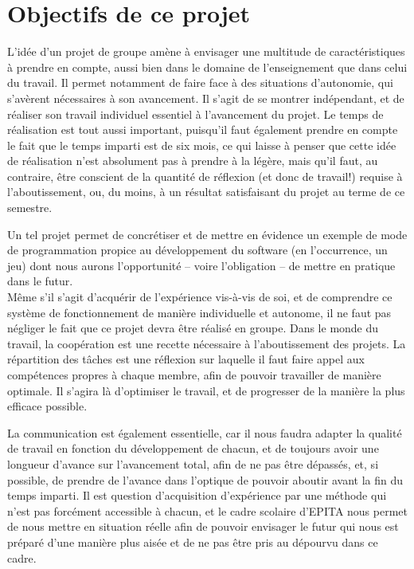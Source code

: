 \documentclass[10pt, titlepage]{report}
\begin{document}
\chapter{Objectifs de ce projet}

L'idée d'un projet de groupe amène à envisager une multitude de caractéristiques à prendre en compte, aussi bien dans le domaine de l'enseignement que dans celui du travail. Il permet notamment de faire face à des situations d'autonomie, qui s'avèrent nécessaires à son avancement. Il s'agit de se montrer indépendant, et de réaliser son travail individuel essentiel à l'avancement du projet. Le temps de réalisation est tout aussi important, puisqu'il faut également prendre en compte le fait que le temps imparti est de six mois, ce qui laisse à penser que cette idée de réalisation n'est absolument pas à prendre à la légère, mais qu'il faut, au contraire, être conscient de la quantité de réflexion (et donc de travail!) requise à l'aboutissement, ou, du moins, à un résultat satisfaisant du projet au terme de ce semestre.

Un tel projet permet de concrétiser et de mettre en évidence un exemple de mode de programmation propice au développement du software (en l’occurrence, un jeu) dont nous aurons l'opportunité – voire l'obligation – de mettre en pratique dans le futur.\\

Même s'il s'agit d'acquérir de l'expérience vis-à-vis de soi, et de comprendre ce système de fonctionnement de manière individuelle et autonome, il ne faut pas négliger le fait que ce projet devra être réalisé en groupe. Dans le monde du travail, la coopération est une recette nécessaire à l'aboutissement des projets. La répartition des tâches est une réflexion sur laquelle il faut faire appel aux compétences propres à chaque membre, afin de pouvoir travailler de manière optimale. Il s'agira là d'optimiser le travail, et de progresser de la manière la plus efficace possible.

La communication est également essentielle, car il nous faudra adapter la qualité de travail en fonction du développement de chacun, et de toujours avoir une longueur d'avance sur l'avancement total, afin de ne pas être dépassés, et, si possible, de prendre de l'avance dans l'optique de pouvoir aboutir avant la fin du temps imparti. Il est question d'acquisition d'expérience par une méthode qui n'est pas forcément accessible à chacun, et le cadre scolaire d'EPITA nous permet de nous mettre en situation réelle afin de pouvoir envisager le futur qui nous est préparé d'une manière plus aisée et de ne pas être pris au dépourvu dans ce cadre.\\ \\ \\ \\ \\ \\ \\ \\ \\ \\ \\
\end{document}
